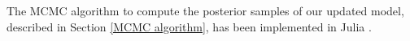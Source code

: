 \documentclass[12pt,	%
	a4paper,		%
	twoside,		%
	openright,		%
	titlepage,%
	]{book}
\theoremstyle{definition}
\let\cite\citep
\begin{document}

The MCMC algorithm to compute the posterior samples of our updated model, described in Section \ref{MCMC algorithm}, has been implemented in Julia \cite{Julia-cite}.
\end{document}
